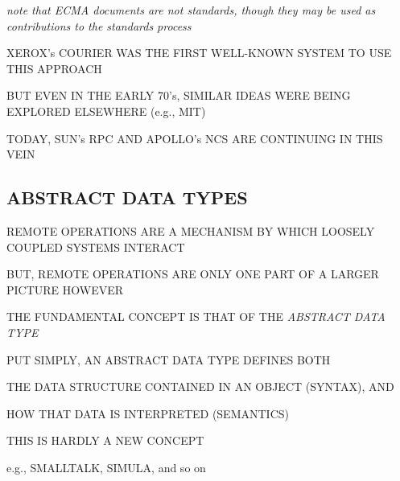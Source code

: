 \begin{note}\em
note that ECMA documents are not standards,
though they may be used as contributions to the standards process
\end{note}


\begin{bwslide}

\begin{nrtc}
\item	XEROX's COURIER WAS THE FIRST WELL-KNOWN SYSTEM TO USE THIS APPROACH

\item	BUT EVEN IN THE EARLY 70's, SIMILAR IDEAS WERE BEING EXPLORED
	ELSEWHERE (e.g., MIT)

\item	TODAY, SUN's RPC AND APOLLO's NCS ARE CONTINUING IN THIS VEIN
\end{nrtc}
\end{bwslide}


\begin{bwslide}
\part*	{ABSTRACT DATA TYPES}\bf

\begin{nrtc}
\item	REMOTE OPERATIONS ARE A MECHANISM BY WHICH LOOSELY COUPLED SYSTEMS
	INTERACT

\item	BUT, REMOTE OPERATIONS ARE ONLY ONE PART OF A LARGER PICTURE HOWEVER

\item	THE FUNDAMENTAL CONCEPT IS THAT OF THE \emph{ABSTRACT DATA TYPE}
\end{nrtc}
\end{bwslide}


\begin{bwslide}

\begin{nrtc}
\item	PUT SIMPLY, AN ABSTRACT DATA TYPE DEFINES BOTH
    \begin{nrtc}
    \item	THE DATA STRUCTURE CONTAINED IN AN OBJECT (SYNTAX), AND

    \item	HOW THAT DATA IS INTERPRETED (SEMANTICS)
    \end{nrtc}

\item	THIS IS HARDLY A NEW CONCEPT
    \begin{nrtc}
    \item	e.g., SMALLTALK, SIMULA, and so on
    \end{nrtc}
\end{nrtc}
\end{bwslide}


